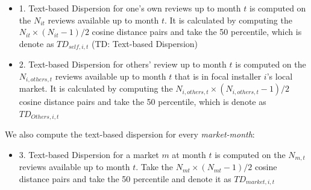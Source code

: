 \documentclass[msom,blindrev]{informs3}
\begin{document}
\begin{itemize}
\item 1. Text-based Dispersion for one's own reviews up to month $t$ is computed on the $N_{it}$ reviews available up to month $t$. It is calculated by computing the $N_{it}\times (N_{it}-1)/2$ cosine distance pairs and take the 50 percentile, which is denote as $TD_{self,i,t}$ (TD: Text-based Dispersion)\\ 
\item 2. Text-based Dispersion for others' review up to month $t$ is computed on the $N_{i,others,t}$ reviews available up to month $t$ that is in focal installer $i$'s local market. It is calculated by computing the $N_{i,others,t}\times (N_{i,others,t}-1)/2$ cosine distance pairs and take the 50 percentile, which is denote as $TD_{Others,i,t}$ \\
\end{itemize}
We also compute the text-based dispersion for every \textit{market-month}: \\ 

\begin{itemize}
\item 3. Text-based Dispersion for a market $m$ at month $t$ is computed on the $N_{m,t}$ reviews available up to month $t$. Take the  $N_{mt}\times (N_{mt}-1)/2$ cosine distance pairs and take the 50 percentile and denote it as $TD_{market,i,t}$ \\ 
\end{itemize}
\end{document}

